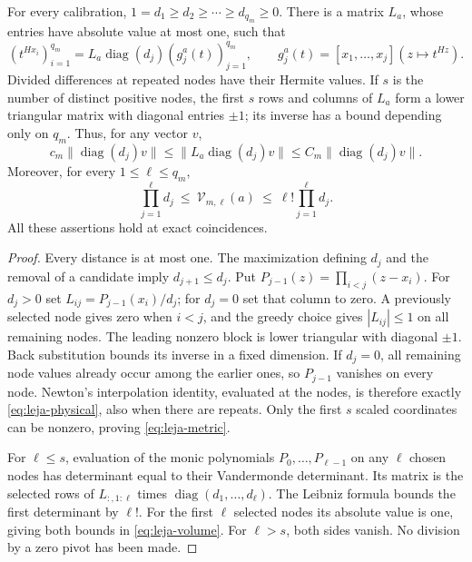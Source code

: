 \begin{lemma}\label{lem:leja-scales}
For every calibration,
$1=d_1\ge d_2\ge\cdots\ge d_{q_m}\ge0$. There is a matrix
$L_a$, whose entries have absolute value at most one, such that
\begin{equation}\label{eq:leja-physical}
 (t^{Hx_i})_{i=1}^{q_m}
     =L_a\operatorname{diag}(d_j)(g_j^a(t))_{j=1}^{q_m},
 \qquad
 g_j^a(t)=[x_1,\ldots,x_j](z\mapsto t^{Hz}).
\end{equation}
Divided differences at repeated nodes have their Hermite values. If
$s$ is the number of distinct positive nodes, the first $s$ rows and
columns of $L_a$ form a lower triangular matrix with diagonal entries
$\pm1$; its inverse has a bound depending only on $q_m$. Thus, for
any vector $v$,
\begin{equation}\label{eq:leja-metric}
 c_m\|\operatorname{diag}(d_j)v\|
 \le\|L_a\operatorname{diag}(d_j)v\|
 \le C_m\|\operatorname{diag}(d_j)v\|.
\end{equation}
Moreover, for every $1\le\ell\le q_m$,
\begin{equation}\label{eq:leja-volume}
 \prod_{j=1}^{\ell}d_j\ \le\ \mathcal V_{m,\ell}(a)
       \ \le\ \ell!\prod_{j=1}^{\ell}d_j.
\end{equation}
All these assertions hold at exact coincidences.
\end{lemma}
\begin{proof}
Every distance is at most one. The maximization defining $d_j$ and the
removal of a candidate imply $d_{j+1}\le d_j$. Put
$P_{j-1}(z)=\prod_{i<j}(z-x_i)$. For $d_j>0$ set
$L_{ij}=P_{j-1}(x_i)/d_j$; for $d_j=0$ set that column to zero.
A previously selected node gives zero when $i<j$, and the greedy choice gives $|L_{ij}|\le1$ on all remaining
nodes. The leading nonzero block is lower triangular with diagonal
$\pm1$. Back substitution bounds its inverse in a fixed dimension.
If $d_j=0$, all remaining node values already occur among the earlier
ones, so $P_{j-1}$ vanishes on every node. Newton's interpolation
identity, evaluated at the nodes, is therefore exactly
\eqref{eq:leja-physical}, also when there are repeats. Only the first
$s$ scaled coordinates can be nonzero, proving \eqref{eq:leja-metric}.

For $\ell\le s$, evaluation of the monic polynomials
$P_0,\ldots,P_{\ell-1}$ on any $\ell$ chosen nodes has determinant
equal to their Vandermonde determinant. Its matrix is the selected rows
of $L_{:,1:\ell}$ times $\operatorname{diag}(d_1,\ldots,d_\ell)$.
The Leibniz formula bounds the first determinant by $\ell!$.
For the first $\ell$ selected nodes its absolute value is one, giving
both bounds in \eqref{eq:leja-volume}. For $\ell>s$, both sides
vanish. No division by a zero pivot has been made.
\end{proof}

